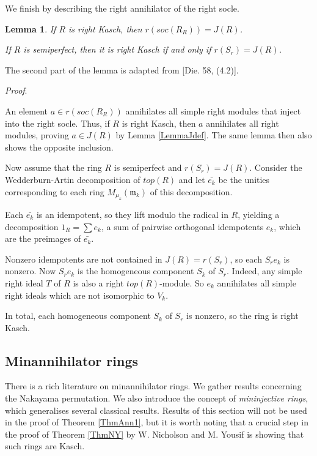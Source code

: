 \documentclass[11pt]{article}
\theoremstyle{plain}
\newtheorem{Lemma}[veta]{Lemma}
\theoremstyle{remark}
\theoremstyle{plain}
\newenvironment{Proof}{
  \par\medskip\noindent
  \textit{Proof}.
}{
\newline
\rightline{$\qedsymbol$}
}
\newcommand{\m}{\mathfrak{m}}
\begin{document}
We finish by describing the right annihilator of the right socle.
\begin{Lemma}\label{LemmaAnnSoc}
If $R$ is right Kasch, then $r(soc(R_R))=J(R)$.

If $R$ is semiperfect, then it is right Kasch if and only if $r(S_r)=J(R)$.
\end{Lemma}
The second part of the lemma is adapted from [Die. 58, (4.2)].
\begin{Proof}
 An element $a\in r(soc(R_R))$ annihilates all simple right modules that inject into the right socle. Thus, if $R$ is right Kasch, then $a$ annihilates all right modules, proving $a\in J(R)$ by Lemma \ref{LemmaJdef}. The same lemma then also shows the opposite inclusion. 

Now assume that the ring $R$ is semiperfect and $r(S_r)=J(R)$. Consider the Wedderburn-Artin decomposition of $top(R)$ and let $\bar{e_k}$ be the unities corresponding to each ring $M_{\mu_k}(\m_k)$ of this decomposition. 

Each $\bar{e_k}$ is an idempotent, so they lift modulo the radical in $R$, yielding a decomposition $1_R=\sum e_k$, a sum of pairwise orthogonal idempotents $e_k$, which are the preimages of $\bar{e_k}$.

Nonzero idempotents are not contained in $J(R)=r(S_r)$, so each $S_re_k$ is nonzero. Now $S_re_k$ is the homogeneous component $S_k$ of $S_r$. Indeed, any simple right ideal $T$ of $R$ is also a right $top(R)$-module. So $e_k$ annihilates all simple right ideals which are not isomorphic to $V_k$. 

In total, each homogeneous component $S_k$ of $S_r$ is nonzero, so the ring is right Kasch. 
\end{Proof}








\subsection{Minannihilator rings}\label{SecDMin}

There is a rich literature on minannihilator rings. We gather results concerning the Nakayama permutation. We also introduce the concept of \textit{mininjective rings}, which generalises several classical results.  Results of this section will not be used in the proof of Theorem \ref{ThmAnn1}, but it is worth noting that a crucial step in the proof of Theorem \ref{ThmNY} by W.  Nicholson and M. Yousif is showing that such rings are Kasch.
\end{document}
